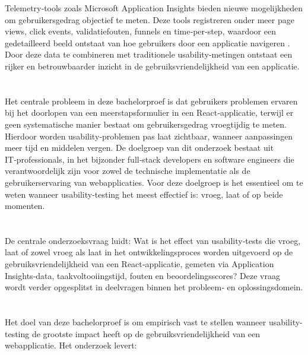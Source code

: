 Telemetry‑tools zoals Microsoft Application Insights bieden nieuwe mogelijkheden om gebruikersgedrag objectief te meten. Deze tools registreren onder meer page views, click events, validatiefouten, funnels en time‑per‑step, waardoor een gedetailleerd beeld ontstaat van hoe gebruikers door een applicatie navigeren \autocite{MicrosoftAI,TelemetryUX2023}. Door deze data te combineren met traditionele usability‑metingen ontstaat een rijker en betrouwbaarder inzicht in de gebruiksvriendelijkheid van een applicatie.


\section{}%
\label{sec:probleemstelling}
Het centrale probleem in deze bachelorproef is dat gebruikers problemen ervaren bij het doorlopen van een meerstapsformulier in een React‑applicatie, terwijl er geen systematische manier bestaat om gebruikersgedrag vroegtijdig te meten. Hierdoor worden usability‑problemen pas laat zichtbaar, wanneer aanpassingen meer tijd en middelen vergen. De doelgroep van dit onderzoek bestaat uit IT‑professionals, in het bijzonder full‑stack developers en software engineers die verantwoordelijk zijn voor zowel de technische implementatie als de gebruikerservaring van webapplicaties. Voor deze doelgroep is het essentieel om te weten wanneer usability‑testing het meest effectief is: vroeg, laat of op beide momenten.

\section{}%
\label{sec:onderzoeksvraag}
De centrale onderzoeksvraag luidt:
Wat is het effect van usability‑tests die vroeg, laat of zowel vroeg als laat in het ontwikkelingsproces worden uitgevoerd op de gebruiksvriendelijkheid van een React‑applicatie, gemeten via Application Insights‑data, taakvoltooiingstijd, fouten en beoordelingsscores?
Deze vraag wordt verder opgesplitst in deelvragen binnen het probleem‑ en oplossingsdomein.

\section{}%
\label{sec:onderzoeksdoelstelling}
Het doel van deze bachelorproef is om empirisch vast te stellen wanneer usability-testing de grootste impact heeft op de gebruiksvriendelijkheid van een webapplicatie. Het onderzoek levert:

